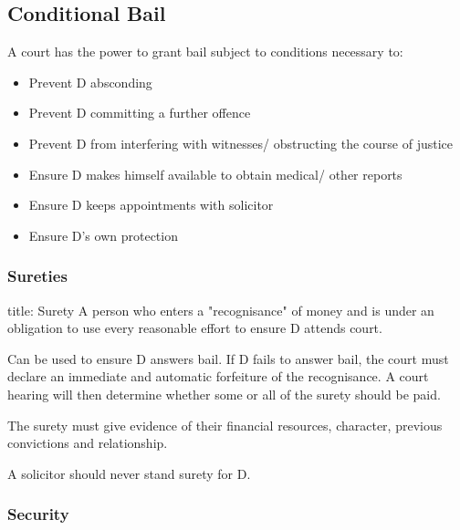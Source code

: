 \documentclass[
]{article}
\newenvironment{Shaded}{}{}
\newcommand{\NormalTok}[1]{#1}
\providecommand{\tightlist}{%
  \setlength{\itemsep}{0pt}\setlength{\parskip}{0pt}}
\begin{document}
\hypertarget{conditional-bail}{%
\subsection{Conditional Bail}\label{conditional-bail}}

A court has the power to grant bail subject to conditions necessary to:

\begin{itemize}
\tightlist
\item
  Prevent D absconding
\item
  Prevent D committing a further offence
\item
  Prevent D from interfering with witnesses/ obstructing the course of
  justice
\item
  Ensure D makes himself available to obtain medical/ other reports
\item
  Ensure D keeps appointments with solicitor
\item
  Ensure D's own protection
\end{itemize}

\hypertarget{sureties}{%
\subsubsection{Sureties}\label{sureties}}

\begin{Shaded}
\begin{Highlighting}[]
\NormalTok{title: Surety}
\NormalTok{A person who enters a "recognisance" of money and is under an obligation to use every reasonable effort to ensure D attends court. }
\end{Highlighting}
\end{Shaded}

Can be used to ensure D answers bail. If D fails to answer bail, the
court must declare an immediate and automatic forfeiture of the
recognisance. A court hearing will then determine whether some or all of
the surety should be paid.

The surety must give evidence of their financial resources, character,
previous convictions and relationship.

\begin{Shaded}
\begin{Highlighting}[]
\NormalTok{A solicitor should never stand surety for D. }
\end{Highlighting}
\end{Shaded}

\hypertarget{security}{%
\subsubsection{Security}\label{security}}
\end{document}
